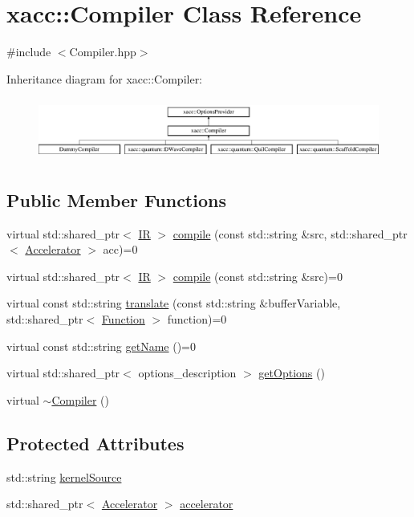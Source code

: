 \hypertarget{a01100}{}\section{xacc\+:\+:Compiler Class Reference}
\label{a01100}


{\ttfamily \#include $<$Compiler.\+hpp$>$}

Inheritance diagram for xacc\+:\+:Compiler\+:\begin{figure}[H]
\begin{center}
\leavevmode
\includegraphics[height=2.079208cm]{a01100}
\end{center}
\end{figure}
\subsection*{Public Member Functions}
\begin{DoxyCompactItemize}
\item 
virtual std\+::shared\+\_\+ptr$<$ \hyperlink{a01148}{IR} $>$ \hyperlink{a01100_a546a40c95bb93af6a0c0ac48dbeaffc8}{compile} (const std\+::string \&src, std\+::shared\+\_\+ptr$<$ \hyperlink{a01084}{Accelerator} $>$ acc)=0
\item 
virtual std\+::shared\+\_\+ptr$<$ \hyperlink{a01148}{IR} $>$ \hyperlink{a01100_a9092f5f779b570c91569b59621280c04}{compile} (const std\+::string \&src)=0
\item 
virtual const std\+::string \hyperlink{a01100_aeedbe58a33fed29e4d7694ae743e25e7}{translate} (const std\+::string \&buffer\+Variable, std\+::shared\+\_\+ptr$<$ \hyperlink{a01124}{Function} $>$ function)=0
\item 
virtual const std\+::string \hyperlink{a01100_a87fca9100e6462122f5b687c3a0fb3fb}{get\+Name} ()=0
\item 
virtual std\+::shared\+\_\+ptr$<$ options\+\_\+description $>$ \hyperlink{a01100_a9f5a8965c9c2dd895016d18264ebbe92}{get\+Options} ()
\item 
virtual \hyperlink{a01100_a5d0b012687d9b44893872eaa81e47b38}{$\sim$\+Compiler} ()
\end{DoxyCompactItemize}
\subsection*{Protected Attributes}
\begin{DoxyCompactItemize}
\item 
std\+::string \hyperlink{a01100_a0ad81c816c09e5113d03cdc02165c453}{kernel\+Source}
\item 
std\+::shared\+\_\+ptr$<$ \hyperlink{a01084}{Accelerator} $>$ \hyperlink{a01100_ad4cbb467fa7e377bac6c054ffcb22b7c}{accelerator}
\end{DoxyCompactItemize}


